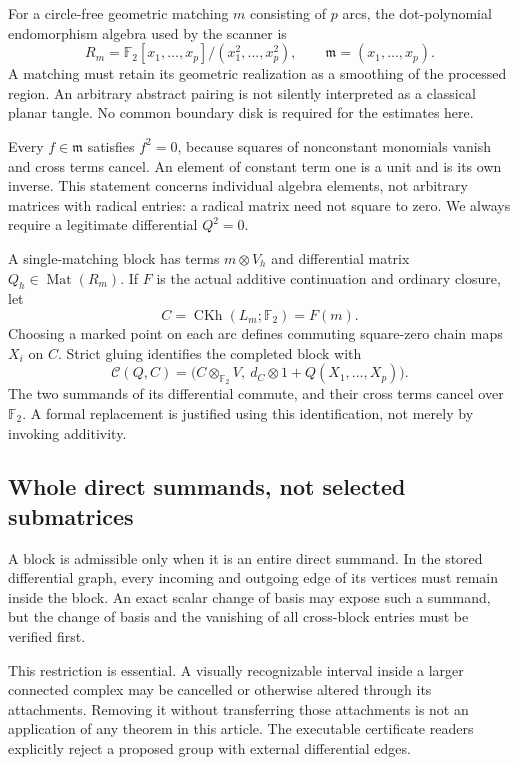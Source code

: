 \documentclass[11pt]{article}
\theoremstyle{definition}\newtheorem{definition}[theorem]{Definition}\newtheorem{example}[theorem]{Example}
\theoremstyle{remark}\newtheorem{remark}[theorem]{Remark}
\newcommand{\F}{{\mathbb{F}_2}}
\newcommand{\CKh}{\operatorname{CKh}}
\newcommand{\rad}{\mathfrak m}
\begin{document}
For a circle-free geometric matching $m$ consisting of $p$ arcs, the dot-polynomial endomorphism algebra used by the scanner is
\[
 R_m=\F[x_1,\ldots,x_p]/(x_1^2,\ldots,x_p^2),\qquad
 \rad=(x_1,\ldots,x_p).
\]
A matching must retain its geometric realization as a smoothing of the processed region. An arbitrary abstract pairing is not silently interpreted as a classical planar tangle. No common boundary disk is required for the estimates here.

Every $f\in\rad$ satisfies $f^2=0$, because squares of nonconstant monomials vanish and cross terms cancel. An element of constant term one is a unit and is its own inverse. This statement concerns individual algebra elements, not arbitrary matrices with radical entries: a radical matrix need not square to zero. We always require a legitimate differential $Q^2=0$.

A single-matching block has terms $m\otimes V_h$ and differential matrix $Q_h\in\operatorname{Mat}(R_m)$. If $F$ is the actual additive continuation and ordinary closure, let
\[
 C=\CKh(L_m;\F)=F(m).
\]
Choosing a marked point on each arc defines commuting square-zero chain maps $X_i$ on $C$. Strict gluing identifies the completed block with
\begin{equation}\label{eq:completed}
 \mathcal C(Q,C)=\bigl(C\otimes_\F V,\ d_C\otimes1+Q(X_1,\ldots,X_p)\bigr).
\end{equation}
The two summands of its differential commute, and their cross terms cancel over $\F$. A formal replacement is justified using this identification, not merely by invoking additivity.

\subsection{Whole direct summands, not selected submatrices}
A block is admissible only when it is an entire direct summand. In the stored differential graph, every incoming and outgoing edge of its vertices must remain inside the block. An exact scalar change of basis may expose such a summand, but the change of basis and the vanishing of all cross-block entries must be verified first.

This restriction is essential. A visually recognizable interval inside a larger connected complex may be cancelled or otherwise altered through its attachments. Removing it without transferring those attachments is not an application of any theorem in this article. The executable certificate readers explicitly reject a proposed group with external differential edges.
\end{document}
